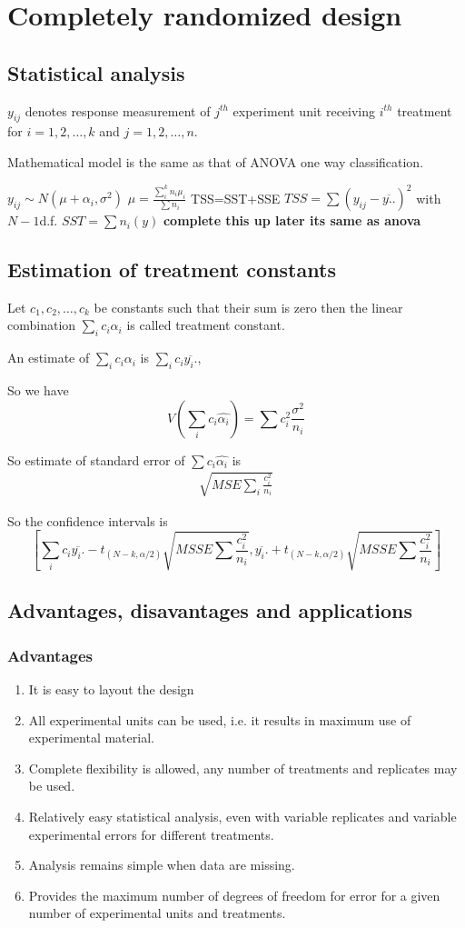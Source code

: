 \documentclass[oneside,11pt,pdftex]{book}%
\numberwithin{equation}{section}
\numberwithin{section}{chapter}
\numberwithin{equation}{chapter}
\begin{document}
\section{Completely randomized design}
\subsection{Statistical analysis}
$ y_{ij} $ denotes response measurement of $ j^{th} $ experiment unit receiving $ i^{th} $ treatment for $ i=1,2,\dots,k $ and $ j=1,2,\dots,n $.

Mathematical model is the same as that of ANOVA one way classification.

$ y_{ij} \sim N(\mu+\alpha_i, \sigma^2) $
$ \mu=\frac{\sum_i^k n_i \mu_i}{\sum n_i} $
TSS=SST+SSE
$ TSS=\sum (y_{ij}-\overline{y..})^2 $ with $ N-1 $d.f.
$ SST= \sum n_i(y) $
\textbf{complete this up later its same as anova }
\subsection{Estimation of treatment constants}
Let $ c_1,c_2,\dots,c_k $ be constants such that their sum is zero then the linear combination $ \sum_i c_i \alpha_i $ is called treatment constant.

An estimate of $ \sum_i c_i \alpha_i $ is $ \sum_i c_i \overline{y_i.} $, 

So we have \[ V(\sum_i c_i \hat{\alpha_i})=\sum c_i^2 \frac{\sigma^2}{n_i} \]

So estimate of standard error of $ \sum c_i \hat{\alpha_i} $ is 
\begin{align*}
	\sqrt{MSE \sum_i \frac{c_i^2}{n_i}}
\end{align*}

So the confidence intervals is 
\[ \left[ \sum_i c_i \overline{y_i.}-t_{(N-k,\alpha/2)}\sqrt{MSSE \sum \frac{c_i^2}{n_i}},\overline{y_i.}+t_{(N-k,\alpha/2)}\sqrt{MSSE \sum \frac{c_i^2}{n_i}} \right]\]

\subsection{Advantages, disavantages and applications}
\subsubsection{Advantages}
\begin{enumerate}
	\item It is easy to layout the design
	\item All experimental units can be used, i.e. it results in maximum use of experimental material.
	\item Complete flexibility is allowed, any number of treatments and replicates may be used.
	\item Relatively easy statistical analysis, even with variable replicates and variable experimental errors for different treatments.
	\item Analysis remains simple when data are missing.
	\item Provides the maximum number of degrees of freedom for error for a given number of experimental units and treatments.
\end{enumerate}
\end{document}
